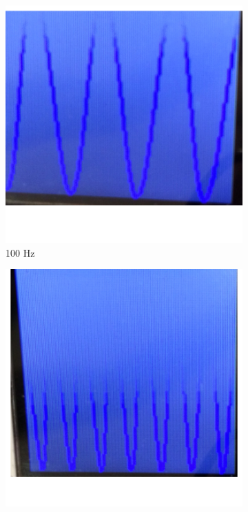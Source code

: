 \documentclass[12pt]{article}
\begin{document}
\begin{figure}[H]
  \centering
  \begin{subfigure}[b]{0.3\textwidth}
    \includegraphics[width=\textwidth]{./img/raw_100Hz}
    \caption{100 Hz}
    \label{fig:raw_100}
  \end{subfigure}
  \begin{subfigure}[b]{0.3\textwidth}
    \includegraphics[width=\textwidth]{./img/raw_200Hz}

\end{subfigure}
\end{figure}
\end{document}

